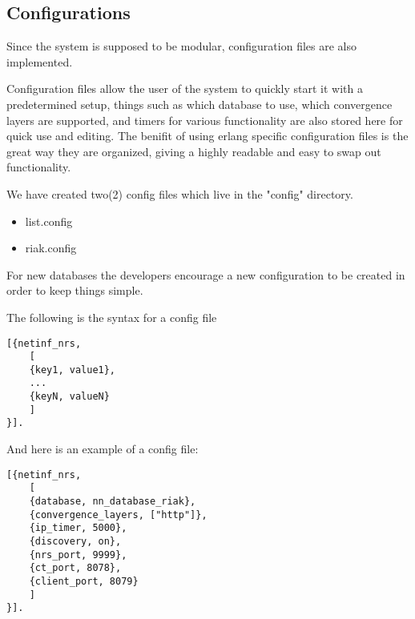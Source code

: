 \subsection {Configurations}

Since the system is supposed to be modular, configuration files are also implemented. 

Configuration files allow the user of the system to quickly start it with a predetermined setup, things such as which database to use, which convergence layers are supported, and timers for various functionality are also stored here for quick use and editing. The benifit of using erlang specific configuration files is the great way they are organized, giving a highly readable and easy to swap out functionality. 

We have created two(2) config files which live in the "config" directory.

\begin {itemize}
\item list.config
\item riak.config
\end {itemize}

For new databases the developers encourage a new configuration to be created in order to keep things simple.

The following is the syntax for a config file 

\begin {verbatim}
[{netinf_nrs,
	[
	{key1, value1},
	...
	{keyN, valueN}
	]
}].

\end{verbatim}
And here is an example of a config file:
\begin {verbatim}
[{netinf_nrs,
	[
	{database, nn_database_riak},
	{convergence_layers, ["http"]},
	{ip_timer, 5000},
	{discovery, on},
	{nrs_port, 9999},
	{ct_port, 8078},
	{client_port, 8079}
	]
}].

\end{verbatim}

